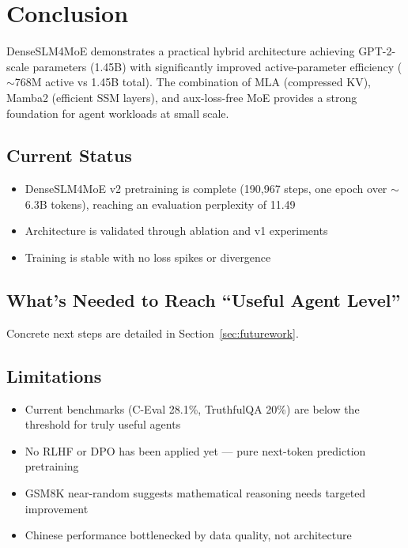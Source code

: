 \section{Conclusion}
\label{sec:conclusion}

DenseSLM4MoE demonstrates a practical hybrid architecture achieving GPT-2-scale parameters (1.45B) with significantly improved active-parameter efficiency ($\sim$768M active vs 1.45B total). The combination of MLA (compressed KV), Mamba2 (efficient SSM layers), and aux-loss-free MoE provides a strong foundation for agent workloads at small scale.

\subsection{Current Status}
\begin{itemize}
    \item DenseSLM4MoE v2 pretraining is complete (190{,}967 steps, one epoch over $\sim$6.3B tokens), reaching an evaluation perplexity of 11.49
    \item Architecture is validated through ablation and v1 experiments
    \item Training is stable with no loss spikes or divergence
\end{itemize}

\subsection{What's Needed to Reach ``Useful Agent Level''}

Concrete next steps are detailed in Section~\ref{sec:futurework}.

\subsection{Limitations}
\begin{itemize}
    \item Current benchmarks (C-Eval 28.1\%, TruthfulQA 20\%) are below the threshold for truly useful agents
    \item No RLHF or DPO has been applied yet --- pure next-token prediction pretraining
    \item GSM8K near-random suggests mathematical reasoning needs targeted improvement
    \item Chinese performance bottlenecked by data quality, not architecture
\end{itemize}

